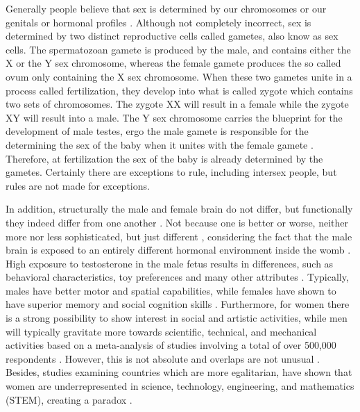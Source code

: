 \documentclass[12pt]{article}
\begin{document}
Generally people believe that sex is determined by our chromosomes or our genitals or hormonal profiles \cite{endOfGender2020Soh}. Although not completely incorrect, sex is determined by two distinct reproductive cells called gametes, also know as sex cells. The spermatozoan gamete is produced by the male, and contains either the X or the Y sex chromosome, whereas the female gamete produces the so called ovum only containing the X sex chromosome. When these two gametes unite in a process called fertilization, they develop into what is called zygote which contains two sets of chromosomes. The zygote XX will result in a female while the zygote XY will result into a male. The Y sex chromosome carries the blueprint for the development of male testes, ergo the male gamete is responsible for the determining the sex of the baby when it unites with the female gamete \cite{endOfGender2020Soh}. Therefore, at fertilization the sex of the baby is already determined by the gametes. Certainly there are exceptions to rule, including intersex people, but rules are not made for exceptions.

In addition, structurally the male and female brain do not differ, but functionally they indeed differ from one another \cite{maleVSFemaleBrain2016Glezerman}. Not because one is better or worse, neither more nor less sophisticated, but just different \cite{maleVSFemaleBrain2016Glezerman}, considering the fact that the male brain is exposed to an entirely different hormonal environment inside the womb \cite{maleVSFemaleBrain2016Glezerman}. High exposure to testosterone in the male fetus results in differences, such as behavioral characteristics, toy preferences and many other attributes \cite{maleVSFemaleBrain2016Glezerman}. Typically, males have better motor and spatial capabilities, while females have shown to have superior memory and social cognition skills \cite{sexDifferences2014Ingalhalikar}. Furthermore, for women there is a strong possibility to show interest in social and artistic activities, while men will typically gravitate more towards scientific, technical, and mechanical activities based on a meta-analysis of studies involving a total of over 500,000 respondents \cite{menAndThings2009Sy}. However, this is not absolute and overlaps are not unusual \cite{maleVSFemaleBrain2016Glezerman}. Besides, studies examining countries which are more egalitarian, have shown that women are underrepresented in science, technology, engineering, and mathematics (STEM), creating a paradox \cite{genderParadox}. 
\end{document}

